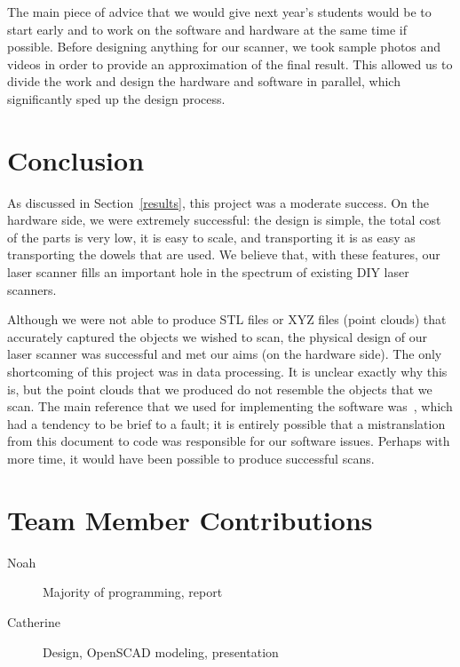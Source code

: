 \documentclass[12pt, letterpaper]{article}
\begin{document}
The main piece of advice that we would give next year's students would be to start
early and to work on the software and hardware at the same time if possible. Before
designing anything for our scanner, we took sample photos and videos in order to
provide an approximation of the final result. This allowed us to divide the work
and design the hardware and software in parallel, which significantly sped up the
design process.

\section{Conclusion}

As discussed in Section~\ref{results}, this project was a moderate success.
On the hardware side, we were extremely successful: the design is simple,
the total cost of the parts is very low, it is easy to scale, and transporting
it is as easy as transporting the dowels that are used. We believe that, with
these features, our laser scanner fills an important hole in the spectrum of
existing DIY laser scanners.

Although we were not able to produce STL files or XYZ files (point clouds) that
accurately captured the objects we wished to scan, the physical design of our
laser scanner was successful and met our aims (on the hardware side).
The only shortcoming of this project was in data processing. It is unclear exactly
why this is, but the point clouds that we produced do not resemble the objects that
we scan.  The main reference that we used for implementing the software
was~\cite{instructions}, which had a tendency to be brief to a fault; it is entirely
possible that a mistranslation from this document to code was responsible for our software
issues.  Perhaps with more time, it would have been possible to produce successful scans.

 

\section{Team Member Contributions}
\begin{description}
    \item[Noah] Majority of programming, report
    \item[Catherine] Design, OpenSCAD modeling, presentation
\end{description}
\end{document}
